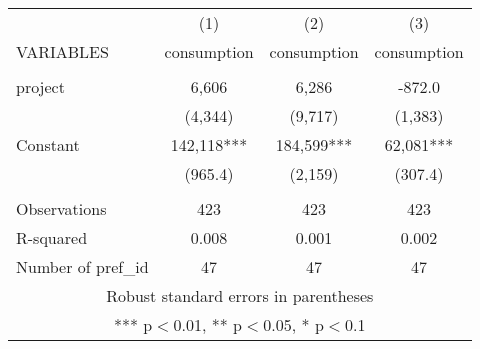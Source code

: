 \documentclass[]{article}
\begin{document}
\begin{tabular}{lccc} \hline
 & (1) & (2) & (3) \\
VARIABLES & consumption & consumption & consumption \\ \hline
 &  &  &  \\
project & 6,606 & 6,286 & -872.0 \\
 & (4,344) & (9,717) & (1,383) \\
Constant & 142,118*** & 184,599*** & 62,081*** \\
 & (965.4) & (2,159) & (307.4) \\
 &  &  &  \\
Observations & 423 & 423 & 423 \\
R-squared & 0.008 & 0.001 & 0.002 \\
 Number of pref\_id & 47 & 47 & 47 \\ \hline
\multicolumn{4}{c}{ Robust standard errors in parentheses} \\
\multicolumn{4}{c}{ *** p$<$0.01, ** p$<$0.05, * p$<$0.1} \\
\end{tabular}
\end{document}
